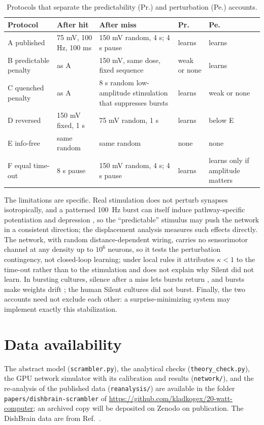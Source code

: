\documentclass[pre,twocolumn,superscriptaddress,showpacs=false,amsmath,amssymb,nofootinbib]{revtex4-2}
\begin{document}
\begin{table}[b]
\caption{Protocols that separate the predictability (Pr.) and perturbation (Pe.) accounts.}
\label{tab:protocols}
\footnotesize
\begin{ruledtabular}
\begin{tabular}{p{1.55cm}p{1.4cm}p{2.2cm}p{0.95cm}p{1.2cm}}
Protocol & After hit & After miss & Pr. & Pe. \\
\hline
A published & 75 mV, 100 Hz, 100 ms & 150 mV random, 4 s; 4 s pause & learns & learns \\
B predictable penalty & as A & 150 mV, same dose, fixed sequence & weak or none & learns \\
C quenched penalty & as A & 8 s random low-amplitude stimulation that suppresses bursts & learns & weak or none \\
D reversed & 150 mV fixed, 1 s & 75 mV random, 1 s & learns & below E \\
E info-free & same random & same random & none & none \\
F equal time-out & 8 s pause & 150 mV random, 4 s; 4 s pause & learns & learns only if amplitude matters \\
\end{tabular}
\end{ruledtabular}
\end{table}

The limitations are specific. Real stimulation does not perturb synapses isotropically, and a patterned 100~Hz burst can itself induce pathway-specific potentiation and depression \cite{Jimbo1999}, so the ``predictable'' stimulus may push the network in a consistent direction; the displacement analysis measures such effects directly. The network, with random distance-dependent wiring, carries no sensorimotor channel at any density up to $10^6$ neurons, so it tests the perturbation contingency, not closed-loop learning; under local rules it attributes $\kappa<1$ to the time-out rather than to the stimulation and does not explain why Silent did not learn. In bursting cultures, silence after a miss lets bursts return \cite{Wagenaar2005}, and bursts make weights drift \cite{Chao2005}; the human Silent cultures did not burst. Finally, the two accounts need not exclude each other: a surprise-minimizing system may implement exactly this stabilization.

\section*{Data availability}
The abstract model (\texttt{scrambler.py}), the analytical checks (\texttt{theory\_check.py}), the GPU network simulator with its calibration and results (\texttt{network/}), and the re-analysis of the published data (\texttt{reanalysis/}) are available in the folder \texttt{papers/dishbrain-scrambler} of \url{https://github.com/kladkogex/20-watt-computer}; an archived copy will be deposited on Zenodo on publication. The DishBrain data are from Ref.~\cite{OSF2022}.
\end{document}

